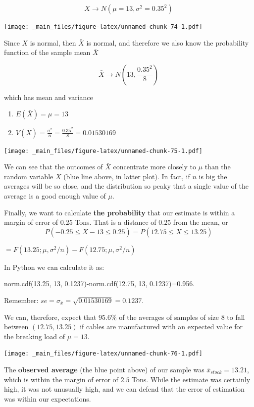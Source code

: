 \documentclass[
]{book}
\providecommand{\tightlist}{%
  \setlength{\itemsep}{0pt}\setlength{\parskip}{0pt}}
\begin{document}
\[X \rightarrow N(\mu=13, \sigma^2=0.35^2)\]

\texttt{[image: \_main\_files/figure-latex/unnamed-chunk-74-1.pdf]}

Since \(X\) is normal, then \(\bar{X}\) is normal, and therefore we also know the probability function of the sample mean \(\bar{X}\)

\[\bar{X} \rightarrow N(13, \frac{0.35^2}{8})\]

which has mean and variance

\begin{enumerate}
\def\labelenumi{\arabic{enumi})}
\tightlist
\item
  \(E(\bar{X})=\mu=13\)
\item
  \(V(\bar{X})=\frac{\sigma^2}{n}=\frac{0.35^2}{8}=0.01530169\)
\end{enumerate}

\texttt{[image: \_main\_files/figure-latex/unnamed-chunk-75-1.pdf]}

We can see that the outcomes of \(\bar{X}\) concentrate more closely to \(\mu\) than the random variable \(X\) (blue line above, in latter plot). In fact, if \(n\) is big the averages will be so close, and the distribution so peaky that a single value of the average is a good enough value of \(\mu\).

Finally, we want to calculate \textbf{the probability} that our estimate is within a margin of error of \(0.25\) Tons. That is a distance of \(0.25\) from the mean, or \[P(-0.25 \leq \bar{X} - 13\leq 0.25)=P(12.75 \leq \bar{X} \leq 13.25)\]

\(=F(13.25; \mu, \sigma^2/n)-F(12.75; \mu, \sigma^2/n)\)

In Python we can calculate it as:

norm.cdf(13.25, 13, 0.1237)-norm.cdf(12.75, 13, 0.1237)=0.956.

Remember: \(se=\sigma_{\bar{x}}=\sqrt{0.01530169}=0.1237\).

We can, therefore, expect that \(95.6\%\) of the averages of samples of size \(8\) to fall between \((12.75, 13.25)\) if cables are manufactured with an expected value for the breaking load of \(\mu=13\).

\texttt{[image: \_main\_files/figure-latex/unnamed-chunk-76-1.pdf]}

The \textbf{observed average} (the blue point above) of our sample was \(\bar{x}_{stock}=13.21\), which is within the margin of error of \(2.5\) Tons. While the estimate was certainly high, it was not unusually high, and we can defend that the error of estimation was within our expectations.
\end{document}
